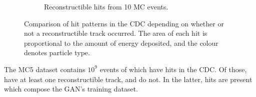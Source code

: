 \begin{figure}
\begin{subfigure}[t]{0.45\textwidth}
        \caption{Reconstructible hits from 10 MC events.}
        \label{fig:cdc_rconst_vs_noise:high}
    \end{subfigure}
    \caption{Comparison of hit patterns in the CDC depending on whether or not a reconstructible track occurred. The area of each hit is proportional to the amount of energy deposited, and the colour denotes particle type.}
    \label{fig:cdc_rconst_vs_noise}
\end{figure}

The MC5 dataset contains $10^{9}$ events of which  have hits in the CDC. Of those,  have at least one reconstructible track, and  do not. In the latter,  hits are present which compose the GAN's training dataset.







